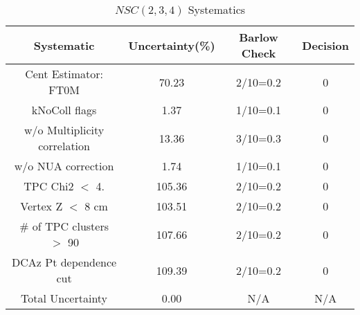 \begin{table}[htbp]
\caption{$NSC(2,3,4)$ Systematics}
\label{tab:Sys_NSC234}
\centering
\begin{tabular}{|c|c|c|c|}
\hline
Systematic & Uncertainty(\%) & Barlow Check & Decision \\
\hline
Cent Estimator: FT0M & 70.23 & 2/10=0.2 & 0 \\
kNoColl flags & 1.37 & 1/10=0.1 & 0 \\
w/o Multiplicity correlation & 13.36 & 3/10=0.3 & 0 \\
w/o NUA correction & 1.74 & 1/10=0.1 & 0 \\
TPC Chi2 $<$ 4. & 105.36 & 2/10=0.2 & 0 \\
Vertex Z $<$ 8 cm & 103.51 & 2/10=0.2 & 0 \\
\# of TPC clusters $>$ 90 & 107.66 & 2/10=0.2 & 0 \\
DCAz Pt dependence cut & 109.39 & 2/10=0.2 & 0 \\
\hline
Total Uncertainty & 0.00 & N/A & N/A \\
\hline
\end{tabular}
\end{table}
